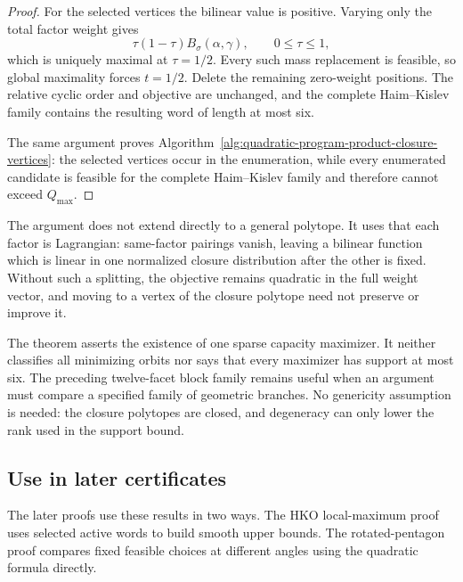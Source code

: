 \begin{proof}
For the selected vertices the bilinear value is positive.  Varying only the
total factor weight gives
\[
  \tau(1-\tau)B_\sigma(\alpha,\gamma),\qquad 0\leq\tau\leq1,
\]
which is uniquely maximal at \(\tau=1/2\). Every such mass replacement is
feasible, so global maximality forces \(t=1/2\). Delete the remaining
zero-weight positions.
The relative cyclic order and objective are unchanged, and the complete
Haim--Kislev family contains the resulting word of length at most six.

The same argument proves
Algorithm~\ref{alg:quadratic-program-product-closure-vertices}: the selected
vertices occur in the enumeration, while every enumerated candidate is
feasible for the complete Haim--Kislev family and therefore cannot exceed
\(Q_{\max}\).
\end{proof}

\begin{remark}
The argument does not extend directly to a general polytope.  It uses that
each factor is Lagrangian: same-factor pairings vanish, leaving a bilinear
function which is linear in one normalized closure distribution after the
other is fixed.  Without such a splitting, the objective remains quadratic in
the full weight vector, and moving to a vertex of the closure polytope need not
preserve or improve it.

The theorem asserts the existence of one sparse capacity maximizer.  It neither
classifies all minimizing orbits nor says that every maximizer has support at
most six.  The preceding twelve-facet block family remains useful when an
argument must compare a specified family of geometric branches.  No
genericity assumption is needed: the closure polytopes are closed, and
degeneracy can only lower the rank used in the support bound.
\end{remark}

\subsection{Use in later certificates}
\label{subsec:quadratic-program-algorithm-hk2019-implementation-status}

The later proofs use these results in two ways.
The HKO local-maximum proof uses selected active words to build smooth upper
bounds. The rotated-pentagon proof compares fixed feasible choices at
different angles using the quadratic formula directly.

